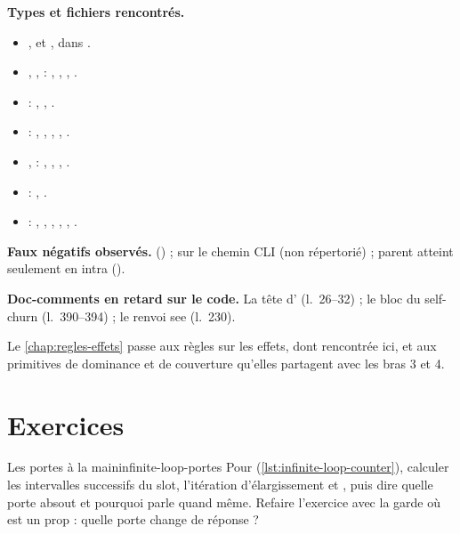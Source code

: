 \begin{resume}
\textbf{Types et fichiers rencontrés.}
\begin{sloppypar}
\begin{itemize}
  \item {},  et , dans .
  \item {}, ,  : , , , .
  \item {} : , , .
  \item {} : , , , , .
  \item {},  : , , , .
  \item {} : , .
  \item {} : , , , , , .
\end{itemize}
\end{sloppypar}

\textbf{Faux négatifs observés.}  () ;  sur le chemin CLI (non répertorié) ; parent atteint seulement en intra ().

\textbf{Doc-comments en retard sur le code.} La tête d' (l.~26--32) ; le bloc du self-churn (l.~390--394) ; le renvoi \og see \fg{} (l.~230).

Le \cref{chap:regles-effets} passe aux règles sur les effets, dont  rencontrée ici, et aux primitives de dominance et de couverture qu'elles partagent avec les bras 3 et 4.
\end{resume}

\section*{Exercices}
\label{sec:infinite-loop-exercices}

\begin{exercice}{Les portes à la main}{infinite-loop-portes}
Pour  (\cref{lst:infinite-loop-counter}), calculer les intervalles successifs du slot, l'itération d'élargissement et , puis dire quelle porte absout et pourquoi  parle quand même. Refaire l'exercice avec la garde  où  est un prop : quelle porte change de réponse ?
\end{exercice}

